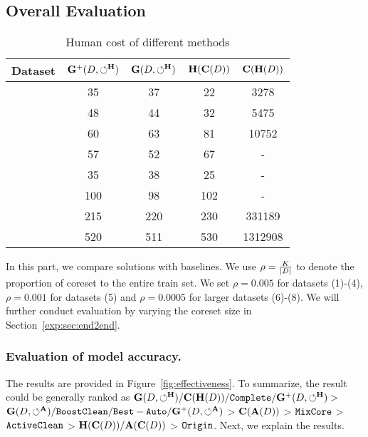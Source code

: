


\subsection{Overall Evaluation}\label{exp:sec:overall}

\begin{table}
	\centering
	\caption{Human cost of different methods}
	\vspace{-1.2em}
	\small
	\begin{tabular}{ccccc}
		\hline
		Dataset & $\mathbf{G}^+(D,\circlearrowleft^\mathbf{H})$ & $\mathbf{G}(D,\circlearrowleft^\mathbf{H})$ & $\mathbf{H}(\mathbf{C}(D))$ & $\mathbf{C}(\mathbf{H}(D))$\\
		\hline
		\nursery & 35 & 37 & 22 & 3278\\
		\hr & 48 & 44 & 32 & 5475\\
		\adult & 60 & 63 & 81 & 10752\\
		\credit & 57 & 52 & 67 & -\\
		\bike & 35 & 38 & 25 & -\\
		\air & 100 & 98 & 102 & -\\
		\imdb & 215 & 220 & 230 & 331189\\
		\imdbl & 520 & 511 & 530 & 1312908 \\
		\hline
	\end{tabular}
	\label{tbl:humancost}
	\vspace{-1em}
\end{table}





In this part, we compare \ours solutions with baselines. We use $\rho = \frac{K}{|D|}$ to denote the proportion of coreset  to the entire train set.  %
We set  $\rho=0.005$ for datasets (1)-(4), $\rho=0.001$ for datasets (5) and  $\rho=0.0005$ for larger datasets (6)-(8).
 We  will further  conduct evaluation by varying the coreset size  in Section~\ref{exp:sec:end2end}.









\subsubsection{Evaluation of model accuracy.}
The results are provided in Figure~\ref{fig:effectiveness}. To summarize, the result could be generally ranked as $\mathbf{G}(D,\circlearrowleft^\mathbf{H})/\mathbf{C}(\mathbf{H}(D))/{\tt Complete}/\mathbf{G}^+(D,\circlearrowleft^\mathbf{H}) > $ $\mathbf{G}(D,\circlearrowleft^\mathbf{A})/{\tt BoostClean} /{\tt Best-Auto} /\mathbf{G}^+(D,\circlearrowleft^\mathbf{A})$ > $\mathbf{C}(\mathbf{A}(D))$ > ${\tt MixCore}$ > ${\tt ActiveClean}$ > $\mathbf{H}(\mathbf{C}(D))/\mathbf{A}(\mathbf{C}(D))$ > ${\tt Origin}$.
Next, we explain the results.

